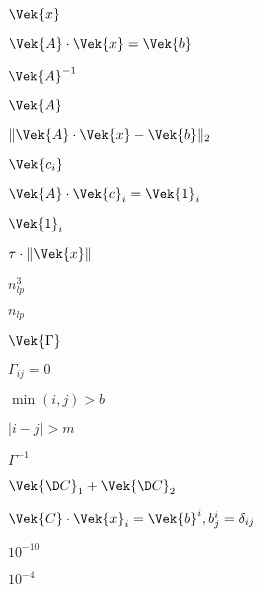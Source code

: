\documentclass{article}
\begin{document}
$\Vek{x}$
\pagebreak

$\Vek{A}\cdot\Vek{x}=\Vek{b}$
\pagebreak

$\Vek{A}^{-1}$
\pagebreak

$\Vek{A}$
\pagebreak

$\Vert\Vek{A}\cdot\Vek{x}-\Vek{b}\Vert_2$
\pagebreak

$\Vek{c_i}$
\pagebreak

$\Vek{A}\cdot\Vek{c}_i=\Vek{1}_i$
\pagebreak

$\Vek{1}_i$
\pagebreak

$\tau\cdot\Vert\Vek{x}\Vert$
\pagebreak

$n_{lp}^3$
\pagebreak

$n_{lp}$
\pagebreak

$\Vek{\Gamma}$
\pagebreak

$\Gamma_{ij}=0$
\pagebreak

$\min(i,j)>b$
\pagebreak

$|i-j|>m$
\pagebreak

$\Gamma^{-1}$
\pagebreak

$\Vek{\D C}_1+\Vek{\D C}_2$
\pagebreak

$\Vek{C}\cdot\Vek{x}_i = \Vek{b}^i, b^i_j = \delta_{ij} $
\pagebreak

$10^{-10}$
\pagebreak

$10^{-4}$
\pagebreak
\end{document}
